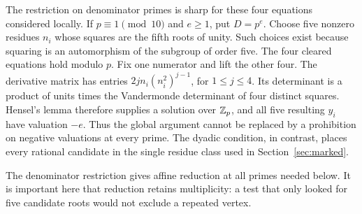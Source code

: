 The restriction on denominator primes is sharp for these four equations
considered locally. If $p\equiv1\pmod{10}$ and $e\ge1$, put $D=p^e$.
Choose five nonzero residues $n_i$ whose squares are the fifth roots of
unity. Such choices exist because squaring is an automorphism of the
subgroup of order five. The four cleared equations hold modulo $p$.
Fix one numerator and lift the other four. The derivative matrix has
entries $2j n_i(n_i^2)^{j-1}$, for $1\le j\le4$. Its determinant is
a product of units times the Vandermonde determinant of four distinct
squares. Hensel's lemma therefore supplies a solution over $\mathbb Z_p$,
and all five resulting $y_i$ have valuation $-e$. Thus the global
argument cannot be replaced by a prohibition on negative valuations
at every prime. The dyadic condition, in contrast, places every rational
candidate in the single residue class used in Section~\ref{sec:marked}.

The denominator restriction gives affine reduction at all primes needed
below. It is important here that reduction retains multiplicity: a test
that only looked for five candidate roots would not exclude a repeated
vertex.

